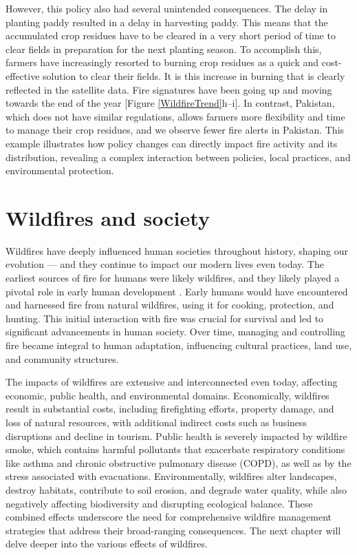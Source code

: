 \documentclass[
  12 pt,
]{Nemilov}
\begin{document}
However, this policy also had several unintended consequences. The delay in planting paddy resulted in a delay in harvesting paddy. This means that the accumulated crop residues have to be cleared in a very short period of time to clear fields in preparation for the next planting season. To accomplish this, farmers have increasingly resorted to burning crop residues as a quick and cost-effective solution to clear their fields. It is this increase in burning that is clearly reflected in the satellite data. Fire signatures have been going up and moving towards the end of the year {[}Figure \ref{WildfireTrend}h--i{]}. In contrast, Pakistan, which does not have similar regulations, allows farmers more flexibility and time to manage their crop residues, and we observe fewer fire alerts in Pakistan. This example illustrates how policy changes can directly impact fire activity and its distribution, revealing a complex interaction between policies, local practices, and environmental protection.

\section{Wildfires and society}\label{wildfires-and-society}

Wildfires have deeply influenced human societies throughout history, shaping our evolution \citep{glikson2013fire} --- and they continue to impact our modern lives even today. The earliest sources of fire for humans were likely wildfires, and they likely played a pivotal role in early human development \citep{gowlett2016discovery}. Early humans would have encountered and harnessed fire from natural wildfires, using it for cooking, protection, and hunting. This initial interaction with fire was crucial for survival and led to significant advancements in human society. Over time, managing and controlling fire became integral to human adaptation, influencing cultural practices, land use, and community structures.

The impacts of wildfires are extensive and interconnected even today, affecting economic, public health, and environmental domains. Economically, wildfires result in substantial costs, including firefighting efforts, property damage, and loss of natural resources, with additional indirect costs such as business disruptions and decline in tourism. Public health is severely impacted by wildfire smoke, which contains harmful pollutants that exacerbate respiratory conditions like asthma and chronic obstructive pulmonary disease (COPD), as well as by the stress associated with evacuations. Environmentally, wildfires alter landscapes, destroy habitats, contribute to soil erosion, and degrade water quality, while also negatively affecting biodiversity and disrupting ecological balance. These combined effects underscore the need for comprehensive wildfire management strategies that address their broad-ranging consequences. The next chapter will delve deeper into the various effects of wildfires.
\end{document}
